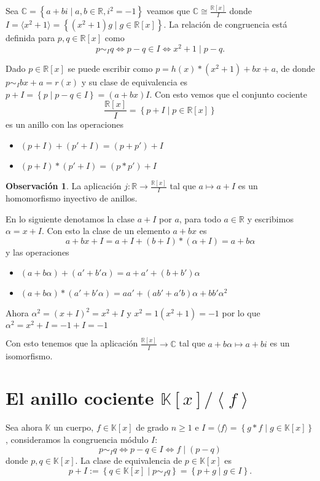 \documentclass[10pt, spanish]{report}
\theoremstyle{definition}
\newtheorem*{obs}{Observación}
\newcommand{\R}{\mathbb{R}}
\newcommand{\C}{\mathbb{C}}
\newcommand{\K}{\mathbb{K}}
\renewcommand{\geq}{\geqslant}
\begin{document}
Sea $\C =\left\{ a+bi\mid a,b\in\R, i^2 = -1 \right\}$ veamos que $\C\cong
\frac{\R[x]}{I}$ donde $I=\langle x^2 +1\rangle=\left\{(x^2+1)g\mid g\in\R[x]
\right\}$. La relación de congruencia está definida para $p,q\in\R[x]$ como
\[p\sim_I q \Leftrightarrow p-q\in I\Leftrightarrow x^2+1\mid p-q.\]

Dado $p\in\R[x]$ se puede escribir como $p=h(x)*(x^2+1)+bx+a$, de donde
$p\sim_I bx+a=r(x)$ y su clase de equivalencia es $p+I=\left\{ p\mid p-q\in
I\right\}=(a+bx)I$. Con esto vemos que el conjunto cociente
\[\frac{\R[x]}{I}=\left\{ p+I\mid p\in\R[x] \right\} \]
es un anillo con las operaciones
\begin{itemize}
    \item $(p+I)+(p'+I) = (p+p')+I$
    \item $(p+I)*(p'+I) = (p*p')+I$
\end{itemize}

\begin{obs}
    La aplicación $j:\R\to\frac{\R[x]}{I}$ tal que $a\mapsto a+I$ es un
    homomorfismo inyectivo de anillos.
\end{obs}

En lo siguiente denotamos la clase $a+I$ por $a$, para todo $a\in\R$ y
escribimos $\alpha = x+I$. Con esto la clase de un elemento $a+bx$ es
\[a+bx+I=a+I+(b+I)*(\alpha+I)=a+b\alpha\]
y las operaciones
\begin{itemize}
    \item $(a+b\alpha)+(a'+b'\alpha)=a+a'+(b+b')\alpha$
    \item $(a+b\alpha)*(a'+b'\alpha)=aa'+(ab'+a'b)\alpha+bb'\alpha^2$
\end{itemize}
Ahora $\alpha^2=(x+I)^2=x^2+I$ y $x^2=1(x^2+1)=-1$ por lo que $\alpha^2=x^2+I
=-1+I=-1$

Con esto tenemos que la aplicación $\frac{\R[x]}{I}\to \C$ tal que
$a+b\alpha\mapsto a+bi$ es un isomorfismo.

\section{El anillo cociente $\K[x]/\left<f\right>$}

Sea ahora $\K$ un cuerpo, $f\in\K[x]$ de grado $n\geq 1$ e $I=\langle f\rangle=
\left\{ g*f\mid g\in\K[x] \right\}$, consideramos la congruencia módulo $I$:
\[p\sim_I q\Leftrightarrow p-q\in I \Leftrightarrow f\mid(p-q)\]
donde $p,q\in\K[x]$. La clase de equivalencia de $p\in\K[x]$ es
\[p+I:=\left\{q\in\K[x]\mid p\sim_Iq\right\}=\left\{p+g\mid g\in I\right\}.\]
\end{document}

